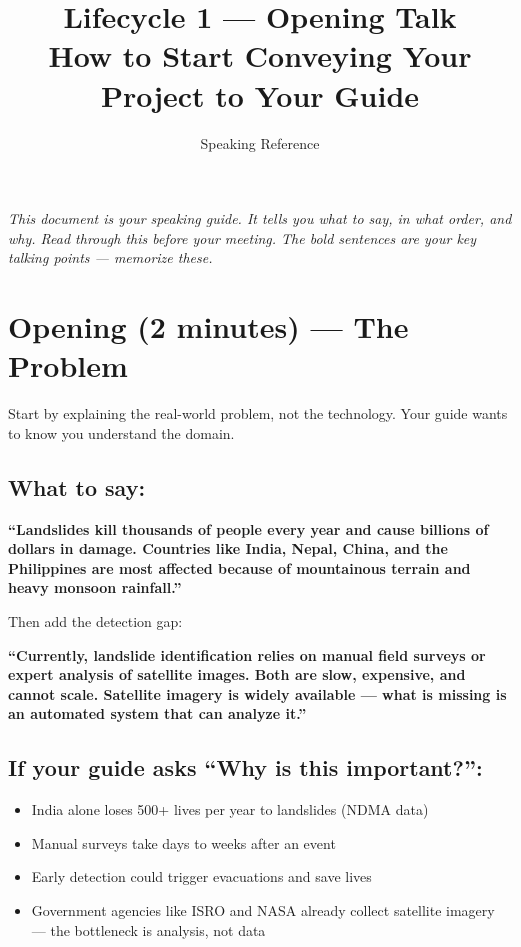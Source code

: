 \documentclass[11pt]{article}
\title{Lifecycle 1 --- Opening Talk \\ \large How to Start Conveying Your Project to Your Guide}
\author{Speaking Reference}
\date{}
\begin{document}
\maketitle

\noindent \textit{This document is your speaking guide. It tells you what to say, in what order, and why. Read through this before your meeting. The bold sentences are your key talking points --- memorize these.}

\tableofcontents
\newpage

\section{Opening (2 minutes) --- The Problem}

Start by explaining the real-world problem, not the technology. Your guide wants to know you understand the domain.

\subsection{What to say:}

\textbf{``Landslides kill thousands of people every year and cause billions of dollars in damage. Countries like India, Nepal, China, and the Philippines are most affected because of mountainous terrain and heavy monsoon rainfall.''}

Then add the detection gap:

\textbf{``Currently, landslide identification relies on manual field surveys or expert analysis of satellite images. Both are slow, expensive, and cannot scale. Satellite imagery is widely available --- what is missing is an automated system that can analyze it.''}

\subsection{If your guide asks ``Why is this important?'':}

\begin{itemize}[noitemsep]
    \item India alone loses 500+ lives per year to landslides (NDMA data)
    \item Manual surveys take days to weeks after an event
    \item Early detection could trigger evacuations and save lives
    \item Government agencies like ISRO and NASA already collect satellite imagery --- the bottleneck is analysis, not data
\end{itemize}
\end{document}

